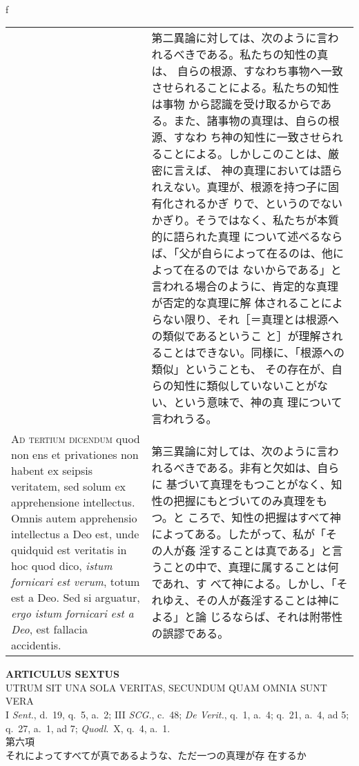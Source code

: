 \\f\documentclass[10pt]{jsarticle} %
\begin{document}
\begin{longtable}{p{21em}p{21em}}
&

第二異論に対しては、次のように言われるべきである。私たちの知性の真は、
自らの根源、すなわち事物へ一致させられることによる。私たちの知性は事物
から認識を受け取るからである。また、諸事物の真理は、自らの根源、すなわ
ち神の知性に一致させられることによる。しかしこのことは、厳密に言えば、
神の真理においては語られえない。真理が、根源を持つ子に固有化されるかぎ
りで、というのでないかぎり。そうではなく、私たちが本質的に語られた真理
について述べるならば、「父が自らによって在るのは、他によって在るのでは
ないからである」と言われる場合のように、肯定的な真理が否定的な真理に解
体されることによらない限り、それ［＝真理とは根源への類似であるというこ
と］が理解されることはできない。同様に、「根源への類似」ということも、
その存在が、自らの知性に類似していないことがない、という意味で、神の真
理について言われうる。

\\

{\scshape Ad tertium dicendum} quod non ens et privationes non habent
ex seipsis veritatem, sed solum ex apprehensione intellectus. Omnis
autem apprehensio intellectus a Deo est, unde quidquid est veritatis
in hoc quod dico, {\itshape istum fornicari est verum}, totum est a
Deo. Sed si arguatur, {\itshape ergo istum fornicari est a Deo}, est
fallacia accidentis.


&

第三異論に対しては、次のように言われるべきである。非有と欠如は、自らに
基づいて真理をもつことがなく、知性の把握にもとづいてのみ真理をもつ。と
ころで、知性の把握はすべて神によってある。したがって、私が「その人が姦
淫することは真である」と言うことの中で、真理に属することは何であれ、す
べて神による。しかし、「それゆえ、その人が姦淫することは神による」と論
じるならば、それは附帯性の誤謬である。

\end{longtable}
\newpage


\begin{center}
 {\Large {\bf ARTICULUS SEXTUS}}\\
 {\large UTRUM SIT UNA SOLA VERITAS, SECUNDUM QUAM OMNIA SUNT VERA}\\
 {\footnotesize I {\itshape Sent.}, d.~19, q.~5, a.~2; III {\itshape
 SCG.}, c.~48; {\itshape De Verit.}, q.~1, a.~4; q.~21, a.~4, ad 5;
 q.~27, a.~1, ad 7; {\itshape Quodl}.~X, q.~4, a.~1.}\\
 {\Large 第六項\\それによってすべてが真であるような、ただ一つの真理が存
 在するか}
\end{center}
\end{document}

